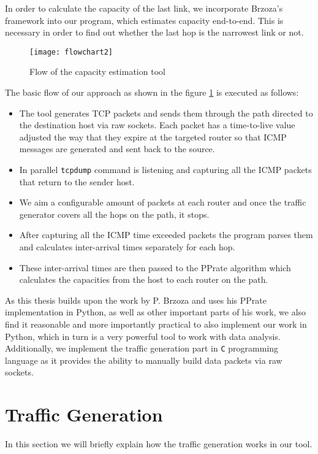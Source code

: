 In order to calculate the capacity of the last link, we incorporate Brzoza's\cite{Brzoza} framework into our program, which estimates capacity end-to-end. This is necessary in order to find out whether the last hop is the narrowest link or not.\\

\begin{figure}[h!]
 \centering
 \texttt{[image: flowchart2]}
 \caption{Flow of the capacity estimation tool}
 \label{flowchart}
\end{figure}


The basic flow of our approach as shown in the figure \ref{flowchart} is executed as follows:
\begin{itemize}
  \item The tool generates TCP packets and sends them through the path directed to the destination host via raw sockets. Each packet has a time-to-live value adjusted the way that they expire at the targeted router so that ICMP messages are generated and sent back to the source.
  \item In parallel \texttt{tcpdump}\cite{tcpdump_man} command is listening and capturing all the ICMP packets that return to the sender host. 
  \item We aim a configurable amount of packets at each router and once the traffic generator covers all the hops on the path, it stops.
  \item After capturing all the ICMP time exceeded packets the program parses them and calculates inter-arrival times separately for each hop.
  \item These inter-arrival times are then passed to the PPrate algorithm which calculates the capacities from the host to each router on the path.
\end{itemize}

As this thesis builds upon the work by P. Brzoza\cite{Brzoza} and uses his PPrate implementation in Python, as well as other important parts of his work, we also find it reasonable and more importantly practical to also implement our work in Python, which in turn is a very powerful tool to work with data analysis. Additionally, we implement the traffic generation part in \texttt{C} programming language as it provides the ability to manually build data packets via raw sockets.

\section{Traffic Generation}
\label{traffic_gen}
In this section we will briefly explain how the traffic generation works in our tool.

